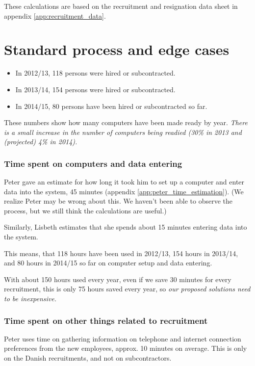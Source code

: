 \label{app:cost_benefit_analysis}
These calculations are based on the recruitment and resignation data sheet in appendix \ref{app:recruitment_data}.

\section{Standard process and edge cases}
\begin{itemize}
\item In 2012/13, 118 persons were hired or subcontracted.
\item In 2013/14, 154 persons were hired or subcontracted.
\item In 2014/15, 80 persons have been hired or subcontracted so far.
\end{itemize}
These numbers show how many computers have been made ready by year.
\emph{There is a small increase in the number of computers being readied (30\% in 2013 and (projected) 4\% in 2014).}

\subsubsection{Time spent on computers and data entering}
Peter gave an estimate for how long it took him to set up a computer and enter data into the system, 45 minutes (appendix \ref{app:peter_time_estimation}). (We realize Peter may be wrong about this. We haven't been able to observe the process, but we still think the calculations are useful.)

Similarly, Lisbeth estimates that she spends about 15 minutes entering data into the system.

This means, that 118 hours have been used in 2012/13, 154 hours in 2013/14, and 80 hours in 2014/15 so far on computer setup and data entering.

With about 150 hours used every year, even if we save 30 minutes for every recruitment, this is only 75 hours saved every year, so \emph{our proposed solutions need to be inexpensive.}

\subsubsection{Time spent on other things related to recruitment}
Peter uses time on gathering information on telephone and internet connection preferences from the new employees, approx. 10 minutes on average.
This is only on the Danish recruitments, and not on subcontractors.

